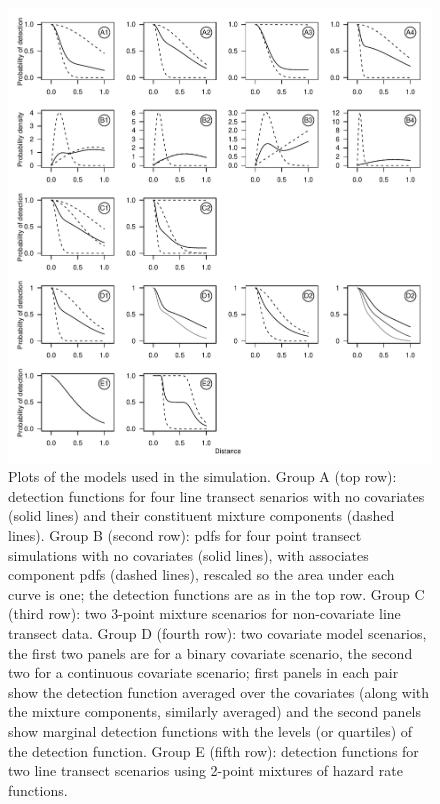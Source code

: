 \documentclass[authoryear,preprint,review,12pt]{elsarticle}
\begin{document}
\begin{figure}
\centering
\includegraphics[width=\textwidth]{figs/sim-detfct.pdf}
\caption{Plots of the models used in the simulation. Group A (top row): detection functions for four line transect senarios with no covariates (solid lines) and their constituent mixture components (dashed lines). Group B (second row): pdfs for four point transect simulations with no covariates (solid lines), with associates component pdfs (dashed lines), rescaled so the area under each curve is one; the detection functions are as in the top row. Group C (third row): two 3-point mixture scenarios for non-covariate line transect data. Group D (fourth row): two covariate model scenarios, the first two panels are for a binary covariate scenario, the second two for a continuous covariate scenario; first panels in each pair show the detection function averaged over the covariates (along with the mixture components, similarly averaged) and the second panels show marginal detection functions with the levels (or quartiles) of the detection function.  Group E (fifth row): detection functions for two line transect scenarios using 2-point mixtures of hazard rate functions.}
\label{sim-detfcts}
\end{figure}
\end{document}
